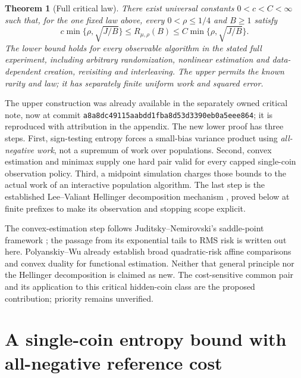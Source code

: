 \documentclass[11pt]{article}
\newtheorem{theorem}{Theorem}
\begin{document}
\begin{theorem}[Full critical law]\label{thm:critical-minimax}
There exist universal constants $0<c<C<\infty$ such that, for the one fixed
law above, every $0<\rho\le1/4$ and $B\ge1$ satisfy
\[
 c\min\{\rho,\sqrt{J/B}\}\le R_{\mu,\rho}(B)
       \le C\min\{\rho,\sqrt{J/B}\}.                    \tag{A}
\]
The lower bound holds for every observable algorithm in the stated full
experiment, including arbitrary randomization, nonlinear estimation and
data-dependent creation, revisiting and interleaving. The upper permits the
known rarity and law; it has separately finite uniform work and squared error.
\end{theorem}

The upper construction was already available in the separately owned critical
note, now at commit \nolinkurl{a8a8dc49115aabdd1fba8d53d3390eb0a5eee864}; it is
reproduced with attribution in the appendix. The new lower proof has three
steps. First, sign-testing entropy forces a small-bias variance product using
\emph{all-negative work}, not a supremum of work over populations. Second,
convex estimation and minimax supply one hard pair valid for every capped
single-coin observation policy. Third, a midpoint simulation charges those
bounds to the actual work of an interactive population algorithm. The last
step is the established Lee--Valiant Hellinger decomposition mechanism
\cite[Lemma 17]{lv}, proved below at finite prefixes to make its observation
and stopping scope explicit.

The convex-estimation step follows Juditsky--Nemirovski's saddle-point
framework \cite{jn}; the passage from its exponential tails to RMS risk is
written out here. Polyanskiy--Wu \cite{pw} already establish broad quadratic-risk
affine comparisons and convex duality for functional estimation. Neither that
general principle nor the Hellinger decomposition is claimed as new. The
cost-sensitive common pair and its application to this critical hidden-coin
class are the proposed contribution; priority remains unverified.

\section{A single-coin entropy bound with all-negative reference cost}
\end{document}
